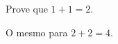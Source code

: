 

\begin{questao}
  Prove que $1+1=2$.
\end{questao}


\begin{questao}
  O mesmo para $2+2=4$.
\end{questao}



